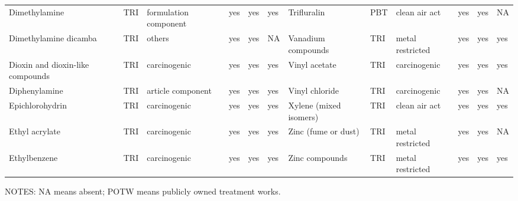\begin{table}[H]
{\begin{tabular}{llllllllllll}
            Dimethylamine                                                              & TRI            & formulation component & yes    & yes     & yes  & Trifluralin                                                                                                        & PBT            & clean air act & yes & yes & NA\\
            Dimethylamine dicamba                                                      & TRI            & others                & yes    & yes     & NA   & Vanadium compounds                                                                                                 & TRI            & metal restricted & yes & yes & yes\\
            Dioxin and dioxin-like compounds                                           & TRI            & carcinogenic          & yes    & yes     & yes  & Vinyl acetate                                                                                                      & TRI            & carcinogenic & yes & yes & yes\\
            Diphenylamine                                                              & TRI            & article component     & yes    & yes     & yes  & Vinyl chloride                                                                                                     & TRI            & carcinogenic          & yes & yes & NA\\
            Epichlorohydrin                                                            & TRI            & carcinogenic          & yes    & yes     & yes  & Xylene (mixed isomers)                                                                                             & TRI            & clean air act & yes & yes & yes\\
            Ethyl acrylate                                                             & TRI            & carcinogenic          & yes    & yes     & yes  & Zinc (fume or dust)                                                                                                & TRI            & metal restricted & yes & yes & NA\\
            Ethylbenzene                                                               & TRI            & carcinogenic          & yes    & yes     & yes  & Zinc compounds                                                                                                     & TRI            & metal restricted      & yes & yes & yes\\
            \bottomrule\bottomrule
        \end{tabular}
    }
    \begin{minipage}\linewidth
        \vspace{0.01in}
        \tiny NOTES: NA means absent; POTW means publicly owned treatment works.
    \end{minipage}
\end{table}
